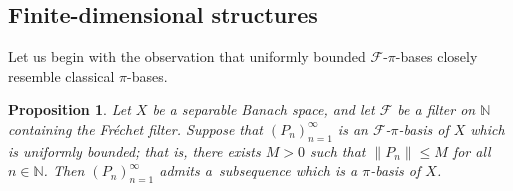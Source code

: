 \documentclass[12pt,fleqn]{amsart}
\newtheorem{proposition}[theorem]{Proposition}
\theoremstyle{definition}
\theoremstyle{remark}
\begin{document}
\subsection{Finite-dimensional structures}
Let us begin with the observation that uniformly bounded \(\mathcal{F}\)-\(\pi\)-bases closely resemble classical \(\pi\)-bases.

\begin{proposition}
Let \(X\) be a separable Banach space, and let \(\mathcal{F}\) be a filter on \(\mathbb{N}\) containing the Fréchet filter. Suppose that \((P_n)_{n=1}^\infty\) is an \(\mathcal{F}\)-\(\pi\)-basis of \(X\) which is uniformly bounded; that is, there exists \(M > 0\) such that \(\|P_n\| \leqslant M\) for all \(n \in \mathbb{N}\). Then \((P_n)_{n=1}^\infty\) admits a~subsequence which is a \(\pi\)-basis of \(X\).
\end{proposition}
\end{document}
